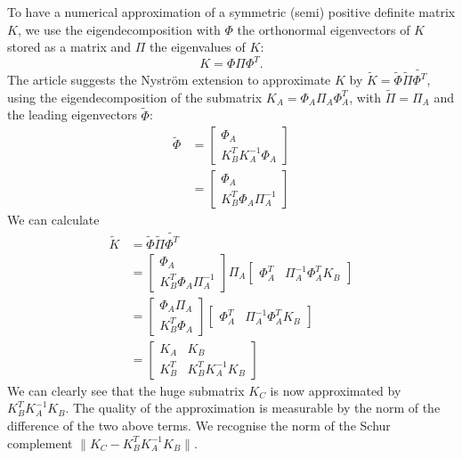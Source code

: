 To have a numerical approximation of a symmetric (semi) positive definite matrix \(K\), we use the eigendecomposition with \(\Phi\) the orthonormal eigenvectors of \(K\) stored as a matrix and \(\Pi\) the eigenvalues of \(K\):
\[K = \Phi \Pi \Phi^T.\]
The article \cite{fowlkes_spectral_2004} suggests the Nystr\"om extension to approximate \(K\) by \(\tilde{K} = \tilde{\Phi} \tilde{\Pi} \tilde{\Phi^T}\), using the eigendecomposition of the submatrix \(K_A = \Phi_A \Pi_A \Phi_A^T\), with \(\tilde{\Pi} = \Pi_A\) and the leading eigenvectors \(\tilde{\Phi}\):
\begin{equation}
 \begin{split}
  \tilde{\Phi} & = \begin{bmatrix}\Phi_A \\ K_B^T K_A^{-1} \Phi_A \end{bmatrix} \\
               & = \begin{bmatrix}\Phi_A \\ K_B^T \Phi_A \Pi_A^{-1} \end{bmatrix}
 \end{split}
\end{equation}
We can calculate
\begin{equation}
 \begin{split}
     \tilde{K} & = \tilde{\Phi} \tilde{\Pi} \tilde{\Phi^T} \\
               & = \begin{bmatrix} \Phi_A \\ K_B^T \Phi_A \Pi_A^{-1} \end{bmatrix} \Pi_A \begin{bmatrix} \Phi_A^T & \Pi_A^{-1} \Phi_A^T K_B \end{bmatrix} \\
               & = \begin{bmatrix} \Phi_A \Pi_A \\ K_B^T \Phi_A \end{bmatrix} \begin{bmatrix} \Phi_A^T & \Pi_A^{-1} \Phi_A^T K_B \end{bmatrix} \\
               & = \begin{bmatrix} K_A & K_B \\ K_B^T & K_B^T K_A^{-1} K_B \end{bmatrix}
 \end{split}
\end{equation}
We can clearly see that the huge submatrix \(K_C\) is now approximated by \(K_B^T K_A^{-1} K_B\).
The quality of the approximation is measurable by the norm of the difference of the two above terms.
We recognise the norm of the Schur complement \(\| K_C - K_B^T K_A^{-1} K_B \| \).

